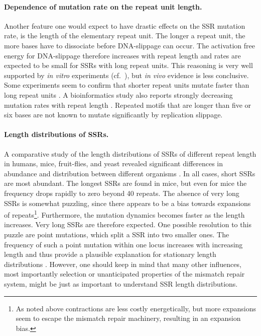 \paragraph{Dependence of mutation rate on the repeat unit length.}
Another feature one would expect to have drastic effects on the SSR mutation rate, is the length of the
elementary repeat unit. The longer a repeat unit, the more bases have to dissociate before
DNA-slippage can occur. The activation free energy for DNA-slippage therefore increases
with repeat length and rates are expected to be small for SSRs with long repeat units. 
This reasoning is very well supported by \emph{in vitro} experiments (cf.~),
but \emph{in vivo} evidence is less conclusive. Some experiments seem to confirm that
shorter repeat units mutate faster than long repeat units \cite{Lee_HumMolGen_99}. A bioinformatics
study also reports strongly decreasing mutation rates with repeat length \cite{Kruglyak_PNAS_98}. Repeated motifs
that are longer than five or six bases are not known to mutate significantly by replication slippage.

\paragraph{Length distributions of SSRs.}
A comparative study of the length distributions of SSRs of different repeat length in humans, mice, 
fruit-flies, and yeast revealed significant differences in abundance and distribution between different
organisms \cite{Kruglyak_PNAS_98}. In all cases, short SSRs are
most abundant. The longest SSRs are found in mice, but even for mice the frequency drops rapidly to zero 
beyond 40 repeats. The absence of very long SSRs is somewhat puzzling, since there appears 
to be a bias towards expansions of repeats\footnote{As noted above contractions are less costly energetically,
but more expansions seem to escape the mismatch repair machinery, resulting in an expansion bias.}. 
Furthermore, the mutation dynamics becomes faster as the length
increases. Very long SSRs are therefore expected. One possible resolution to this puzzle are point
mutations, which split a SSR into two smaller ones. The frequency of such a point mutation within one locus
increases with increasing length and thus provide a plausible explanation for stationary 
length distributions \cite{Kruglyak_PNAS_98}. However, one should keep in mind that many other influences, most importantly selection or unanticipated properties of the mismatch repair system, might be just as important
to understand SSR length distributions. 

